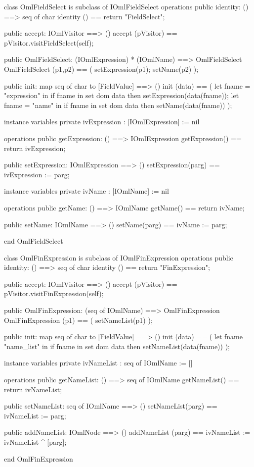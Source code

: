 \begin{vdm_al}
class OmlFieldSelect is subclass of IOmlFieldSelect
operations
  public identity: () ==> seq of char
  identity () == return "FieldSelect";

  public accept: IOmlVisitor ==> ()
  accept (pVisitor) == pVisitor.visitFieldSelect(self);

  public OmlFieldSelect:
      (IOmlExpression) *
      (IOmlName) ==> OmlFieldSelect
  OmlFieldSelect (p1,p2) == 
   ( setExpression(p1);
     setName(p2) );

  public init: map seq of char to [FieldValue] ==> ()
  init (data) ==
    ( let fname = "expression" in
        if fname in set dom data
        then setExpression(data(fname));
      let fname = "name" in
        if fname in set dom data
        then setName(data(fname)) );

instance variables
  private ivExpression : [IOmlExpression] := nil

operations
  public getExpression: () ==> IOmlExpression
  getExpression() == return ivExpression;

  public setExpression: IOmlExpression ==> ()
  setExpression(parg) == ivExpression := parg;

instance variables
  private ivName : [IOmlName] := nil

operations
  public getName: () ==> IOmlName
  getName() == return ivName;

  public setName: IOmlName ==> ()
  setName(parg) == ivName := parg;

end OmlFieldSelect
\end{vdm_al}

\begin{vdm_al}
class OmlFinExpression is subclass of IOmlFinExpression
operations
  public identity: () ==> seq of char
  identity () == return "FinExpression";

  public accept: IOmlVisitor ==> ()
  accept (pVisitor) == pVisitor.visitFinExpression(self);

  public OmlFinExpression:
      (seq of IOmlName) ==> OmlFinExpression
  OmlFinExpression (p1) == 
   ( setNameList(p1) );

  public init: map seq of char to [FieldValue] ==> ()
  init (data) ==
    ( let fname = "name_list" in
        if fname in set dom data
        then setNameList(data(fname)) );

instance variables
  private ivNameList : seq of IOmlName := []

operations
  public getNameList: () ==> seq of IOmlName
  getNameList() == return ivNameList;

  public setNameList: seq of IOmlName ==> ()
  setNameList(parg) == ivNameList := parg;

  public addNameList: IOmlNode ==> ()
  addNameList (parg) == ivNameList := ivNameList ^ [parg];

end OmlFinExpression
\end{vdm_al}

